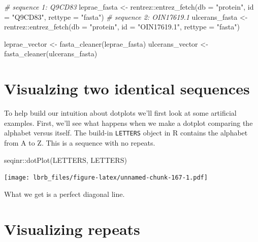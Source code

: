 \documentclass[
]{book}
\newenvironment{Shaded}{\begin{snugshade}}{\end{snugshade}}
\newcommand{\AttributeTok}[1]{\textcolor[rgb]{0.77,0.63,0.00}{#1}}
\newcommand{\CommentTok}[1]{\textcolor[rgb]{0.56,0.35,0.01}{\textit{#1}}}
\newcommand{\FunctionTok}[1]{\textcolor[rgb]{0.00,0.00,0.00}{#1}}
\newcommand{\NormalTok}[1]{#1}
\newcommand{\OtherTok}[1]{\textcolor[rgb]{0.56,0.35,0.01}{#1}}
\newcommand{\SpecialCharTok}[1]{\textcolor[rgb]{0.00,0.00,0.00}{#1}}
\newcommand{\StringTok}[1]{\textcolor[rgb]{0.31,0.60,0.02}{#1}}
\begin{document}
\begin{Shaded}
\begin{Highlighting}[]
\CommentTok{\# sequence 1: Q9CD83}
\NormalTok{leprae\_fasta }\OtherTok{\textless{}{-}}\NormalTok{ rentrez}\SpecialCharTok{::}\FunctionTok{entrez\_fetch}\NormalTok{(}\AttributeTok{db =} \StringTok{"protein"}\NormalTok{,}
                        \AttributeTok{id =} \StringTok{"Q9CD83"}\NormalTok{,}
                         \AttributeTok{rettype =} \StringTok{"fasta"}\NormalTok{)}
\CommentTok{\# sequence 2: OIN17619.1}
\NormalTok{ulcerans\_fasta }\OtherTok{\textless{}{-}}\NormalTok{ rentrez}\SpecialCharTok{::}\FunctionTok{entrez\_fetch}\NormalTok{(}\AttributeTok{db =} \StringTok{"protein"}\NormalTok{,}
                         \AttributeTok{id =} \StringTok{"OIN17619.1"}\NormalTok{,}
                         \AttributeTok{rettype =} \StringTok{"fasta"}\NormalTok{)}

\NormalTok{leprae\_vector   }\OtherTok{\textless{}{-}} \FunctionTok{fasta\_cleaner}\NormalTok{(leprae\_fasta)}
\NormalTok{ulcerans\_vector }\OtherTok{\textless{}{-}} \FunctionTok{fasta\_cleaner}\NormalTok{(ulcerans\_fasta)}
\end{Highlighting}
\end{Shaded}

\hypertarget{visualzing-two-identical-sequences}{%
\section{Visualzing two identical sequences}\label{visualzing-two-identical-sequences}}

To help build our intuition about dotplots we'll first look at some artificial examples. First, we'll see what happens when we make a dotplot comparing the alphabet versus itself. The build-in \texttt{LETTERS} object in R contains the alphabet from A to Z. This is a sequence with no repeats.

\begin{Shaded}
\begin{Highlighting}[]
\NormalTok{seqinr}\SpecialCharTok{::}\FunctionTok{dotPlot}\NormalTok{(LETTERS, }
\NormalTok{                LETTERS)}
\end{Highlighting}
\end{Shaded}

\texttt{[image: lbrb\_files/figure-latex/unnamed-chunk-167-1.pdf]}

What we get is a perfect diagonal line.

\hypertarget{visualizing-repeats}{%
\section{Visualizing repeats}\label{visualizing-repeats}}
\end{document}
